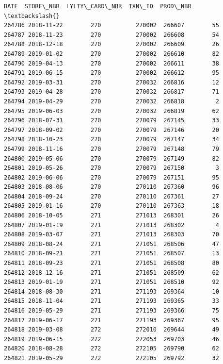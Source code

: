 \documentclass[11pt]{article}
\makeatletter
\newcommand{\boxspacing}{\kern\kvtcb@left@rule\kern\kvtcb@boxsep}
\newcommand{\prompt}[4]{
        {\ttfamily\llap{{\color{#2}[#3]:\hspace{3pt}#4}}\vspace{-\baselineskip}}
    }
\makeatother
\begin{document}
            \begin{tcolorbox}[breakable, size=fbox, boxrule=.5pt, pad at break*=1mm, opacityfill=0]
\prompt{Out}{outcolor}{50}{\boxspacing}
\begin{Verbatim}[commandchars=\\\{\}]
             DATE  STORE\_NBR  LYLTY\_CARD\_NBR  TXN\_ID  PROD\_NBR  \textbackslash{}
264786 2018-11-22        270          270002  266607        55
264787 2018-11-23        270          270002  266608        54
264788 2018-12-18        270          270002  266609        26
264789 2019-01-02        270          270002  266610        82
264790 2019-04-13        270          270002  266611        38
264791 2019-06-15        270          270002  266612        95
264792 2019-03-31        270          270032  266816        12
264793 2019-04-28        270          270032  266817        71
264794 2019-04-29        270          270032  266818         2
264795 2019-06-03        270          270032  266819        62
264796 2018-07-31        270          270079  267145        33
264797 2018-09-02        270          270079  267146        20
264798 2018-10-23        270          270079  267147        34
264799 2018-11-16        270          270079  267148        79
264800 2019-05-06        270          270079  267149        82
264801 2019-05-26        270          270079  267150         3
264802 2019-06-06        270          270079  267151        95
264803 2018-08-06        270          270110  267360        96
264804 2018-09-24        270          270110  267361        27
264805 2019-01-16        270          270110  267363        18
264806 2018-10-05        271          271013  268301        26
264807 2019-01-19        271          271013  268302         4
264808 2019-03-07        271          271013  268303        70
264809 2018-08-24        271          271051  268506        47
264810 2018-09-21        271          271051  268507        13
264811 2018-09-23        271          271051  268508        80
264812 2018-12-16        271          271051  268509        62
264813 2019-01-19        271          271051  268510        92
264814 2018-08-30        271          271193  269364        10
264815 2018-11-04        271          271193  269365        33
264816 2019-05-29        271          271193  269366        75
264817 2019-06-17        271          271193  269367        95
264818 2019-03-08        272          272010  269644        49
264819 2019-06-15        272          272053  269703        46
264820 2018-08-28        272          272105  269790        62
264821 2019-05-29        272          272105  269792        32

\end{Verbatim}
\end{tcolorbox}
\end{document}
